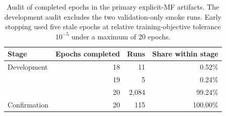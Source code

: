 \begin{table}[H]
\centering
\caption{Audit of completed epochs in the primary explicit-MF artifacts. The development audit excludes the two validation-only smoke runs. Early stopping used five stale epochs at relative training-objective tolerance $10^{-5}$ under a maximum of 20 epochs.}
\label{tab:supp-primary-epochs}
\small
\begin{tabular}{@{}lrrr@{}}
\toprule
Stage & Epochs completed & Runs & Share within stage \\
\midrule
Development & 18 & 11 & 0.52\% \\
 & 19 & 5 & 0.24\% \\
 & 20 & 2,084 & 99.24\% \\
\addlinespace
Confirmation & 20 & 115 & 100.00\% \\
\bottomrule
\end{tabular}
\end{table}
